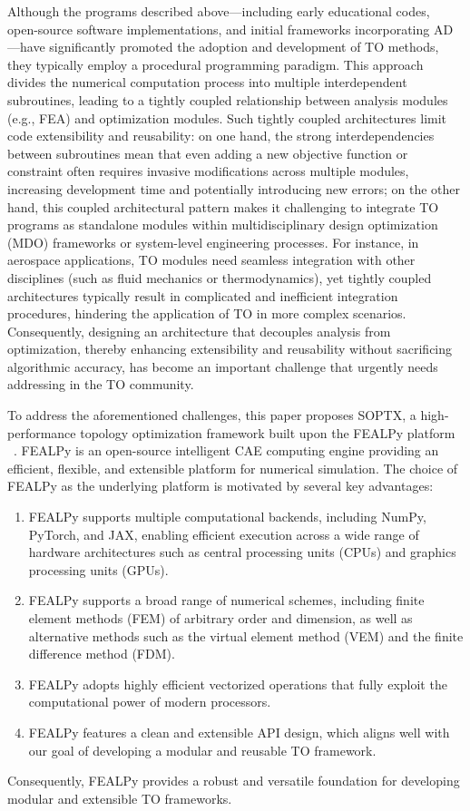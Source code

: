 \documentclass[mathpazo]{cicp}
\begin{document}
Although the programs described above—including early educational codes, open-source software implementations, and initial frameworks incorporating AD—have significantly promoted the adoption and development of TO methods, they typically employ a procedural programming paradigm. This approach divides the numerical computation process into multiple interdependent subroutines, leading to a tightly coupled relationship between analysis modules (e.g., FEA) and optimization modules. Such tightly coupled architectures limit code extensibility and reusability: on one hand, the strong interdependencies between subroutines mean that even adding a new objective function or constraint often requires invasive modifications across multiple modules, increasing development time and potentially introducing new errors; on the other hand, this coupled architectural pattern makes it challenging to integrate TO programs as standalone modules within multidisciplinary design optimization (MDO) frameworks or system-level engineering processes. For instance, in aerospace applications, TO modules need seamless integration with other disciplines (such as fluid mechanics or thermodynamics), yet tightly coupled architectures typically result in complicated and inefficient integration procedures, hindering the application of TO in more complex scenarios. Consequently, designing an architecture that decouples analysis from optimization, thereby enhancing extensibility and reusability without sacrificing algorithmic accuracy, has become an important challenge that urgently needs addressing in the TO community.

To address the aforementioned challenges, this paper proposes SOPTX, a high-performance topology optimization framework built upon the FEALPy platform ~\cite{fealpy}. FEALPy is an open-source intelligent CAE computing engine providing an efficient, flexible, and extensible platform for numerical simulation. The choice of FEALPy as the underlying platform is motivated by several key advantages:
\vspace{-1ex}
\begin{enumerate}
	\item FEALPy supports multiple computational backends, including NumPy, PyTorch, and JAX, enabling efficient execution across a wide range of hardware architectures such as central processing units (CPUs) and graphics processing units (GPUs).
	\item FEALPy supports a broad range of numerical schemes, including finite element methods (FEM) of arbitrary order and dimension, as well as alternative methods such as the virtual element method (VEM) and the finite difference method (FDM).
	\item FEALPy adopts highly efficient vectorized operations that fully exploit the computational power of modern processors.
	\item FEALPy features a clean and extensible API design, which aligns well with our goal of developing a modular and reusable TO framework.
\end{enumerate}
\vspace{-1ex}
Consequently, FEALPy provides a robust and versatile foundation for developing modular and extensible TO frameworks.
\end{document}
